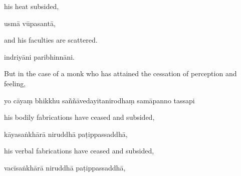 \begin{samepage}
\begin{leftcolumn*}
his heat subsided,
\end{leftcolumn*}

\begin{rightcolumn}
usmā vūpasantā,
\end{rightcolumn}
\end{samepage}

\begin{samepage}
\begin{leftcolumn*}
and his faculties are scattered.
\end{leftcolumn*}

\begin{rightcolumn}
indriyāni paribhinnāni.
\end{rightcolumn}
\end{samepage}

\begin{samepage}
\begin{leftcolumn*}
But in the case of a monk who has attained the cessation of perception and feeling,
\end{leftcolumn*}

\begin{rightcolumn}
yo cāyaṃ bhikkhu saññāvedayitanirodhaṃ samāpanno tassapi
\end{rightcolumn}
\end{samepage}

\begin{samepage}
\begin{leftcolumn*}
his bodily fabrications have ceased and subsided,
\end{leftcolumn*}

\begin{rightcolumn}
kāyasaṅkhārā niruddhā paṭippassaddhā,
\end{rightcolumn}
\end{samepage}

\begin{samepage}
\begin{leftcolumn*}
his verbal fabrications have ceased and subsided,
\end{leftcolumn*}

\begin{rightcolumn}
vacīsaṅkhārā niruddhā paṭippassaddhā,
\end{rightcolumn}
\end{samepage}

